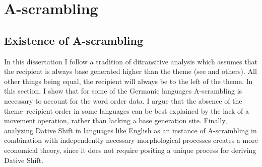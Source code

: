 %
%
%
%
%
%
%
%
%
%
%
%
%
%
%
%
%
%


\section{A-scrambling}\label{sec:Ascrambling}
\subsection{Existence of A-scrambling}
In this dissertation I follow a tradition of ditransitive analysis which assumes that the recipient is always base generated higher than the theme (see \cite{Barss.1986,Anagnostopoulou.2003,Georgala.2011,Georgala.2011b} and others). All other things being equal, the recipient will always be to the left of the theme. In this section, I show that for some of the Germanic languages A-scrambling is necessary to account for the word order data. I argue that the absence of the theme--recipient order in some languages can be best explained by the lack of a movement operation, rather than lacking a base generation site. Finally, analyzing Dative Shift in languages like English as an instance of A-scrambling in combination with independently necessary morphological processes creates a more economical theory, since it does not require positing a unique process for deriving Dative Shift.

